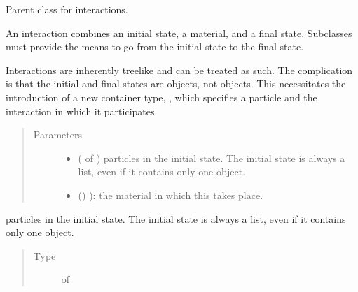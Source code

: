 \documentclass[letterpaper,10pt,english]{sphinxmanual}
\begin{document}

\begin{fulllineitems}
\label{\detokenize{code_structure:scdc.interaction.Interaction}}
Parent class for interactions.

An interaction combines an initial state, a material, and a final state.
Subclasses must provide the means to go from the initial state to the final
state.

Interactions are inherently treelike and can be treated as such. The
complication is that the initial and final states are  objects,
not  objects. This necessitates the introduction of a new
container type, , which specifies a particle and
the interaction in which it participates.
\begin{quote}\begin{description}
\item[{Parameters}] \leavevmode\begin{itemize}
\item {} 
 ( of ) \textendash{} particles in the
initial state. The initial state is always a list, even if it
contains only one object.

\item {} 
\sphinxstyleliteralstrong{\sphinxupquote{(}} () \textendash{} ): the material in which this takes place.

\end{itemize}

\end{description}\end{quote}

\begin{fulllineitems}
\label{\detokenize{code_structure:scdc.interaction.Interaction.initial_state}}
particles in the
initial state. The initial state is always a list, even if it
contains only one object.
\begin{quote}\begin{description}
\item[{Type}] \leavevmode
{} of 


\end{description}
\end{quote}
\end{fulllineitems}
\end{fulllineitems}
\end{document}
